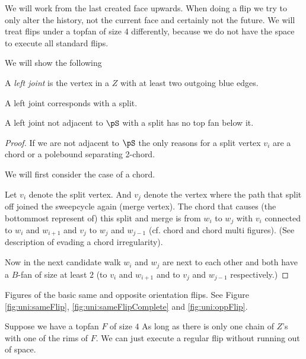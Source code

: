   We will work from the last created face upwards. When doing a flip we try to only alter the history, not the current face and certainly not the future. We will treat flips under a topfan of size 4 differently, because we do not have the space to execute all standard flips.

  We will show the following

  \begin{defi}
    A \emph{left joint} is the vertex in a $Z$ with at least two outgoing blue edges.
  \end{defi}

  A left joint corresponds with a split.

  \begin{lemma}
    \label{lm:}
    A left joint not adjacent to $\pS$ with a split has no top fan below it.
  \end{lemma}
  \begin{proof}
    If we are not adjacent to $\pS$ the only reasons for a split vertex $v_i$ are a chord or a polebound separating 2-chord.

    We will first consider the case of a chord.

    Let $v_i$ denote the split vertex. And $v_j$ denote the vertex where the path that split off joined the sweepcycle again (merge vertex). The chord that causes (the bottommost represent of) this split and merge is from $w_i$ to $w_j$ with $v_i$ connected to $w_i$ and $w_{i+1}$ and $v_j$ to $w_j$ and $w_{j-1}$ (cf. chord and chord multi figures). (See description of evading a chord irregularity).

    Now in the next candidate walk $w_i$ and $w_j$ are next to each other and both have a $B$-fan of size at least $2$ (to $v_i$ and $w_{i+1}$ and to $v_j$ and $w_{j-1}$ respectively.)

  \end{proof}

  Figures of the basic same and opposite orientation flips.
   See Figure \ref{fig:uni:sameFlip}, \ref{fig:uni:sameFlipComplete} and \ref{fig:uni:oppFlip}.

  Suppose we have a topfan $F$ of size $4$
  As long as there is only one chain of $Z$'s with one of the rims of $F$. We can just execute a regular flip without running out of space.





